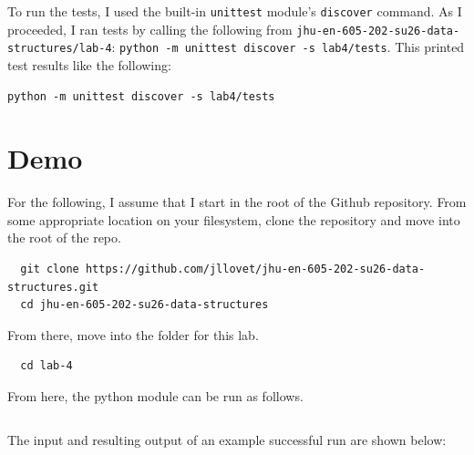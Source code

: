 \documentclass[10pt,letterpaper,final]{report}
\begin{document}
To run the tests, I used the built-in \texttt{unittest} module's \texttt{discover} command. As I proceeded, I ran tests by calling the following from \texttt{jhu-en-605-202-su26-data-structures/lab-4}: \texttt{python -m unittest discover -s lab4/tests}. This printed test results like the following:

{\small
{}
  \begin{verbatim}
python -m unittest discover -s lab4/tests
\end{verbatim}
}

\pagebreak
\section{Demo}\label{sec:demo}

For the following, I assume that I start in the root of the Github repository. From some appropriate location on your filesystem, clone the repository and move into the root of the repo.
  {\small
    \begin{verbatim}
  git clone https://github.com/jllovet/jhu-en-605-202-su26-data-structures.git
  cd jhu-en-605-202-su26-data-structures
\end{verbatim}
  }

\noindent From there, move into the folder for this lab.

  {\small
    \begin{verbatim}
  cd lab-4
\end{verbatim}
  }

\noindent From here, the python module can be run as follows.



\begin{verbatim}
\end{verbatim}

\noindent The input and resulting output of an example successful run are shown below:

\end{document}
